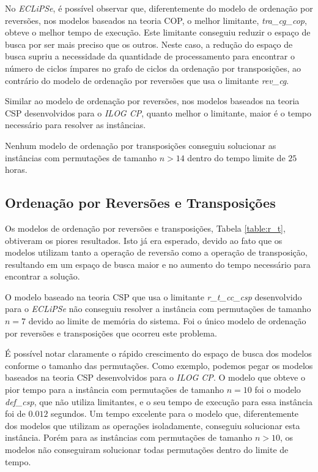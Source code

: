 No \textit{ECLiPSe}, é possível observar que, diferentemente do modelo
de ordenação por reversões, nos modelos baseados na teoria COP, o
melhor limitante, \textit{tra\_cg\_cop}, obteve o melhor tempo de
execução. Este limitante conseguiu reduzir o espaço de busca por ser
mais preciso que os outros. Neste caso, a redução do espaço de busca
supriu a necessidade da quantidade de processamento para encontrar o
número de ciclos ímpares no grafo de ciclos da ordenação por
transposições, ao contrário do modelo de ordenação por reversões que
usa o limitante \textit{rev\_cg}.

Similar ao modelo de ordenação por reversões, nos modelos baseados na
teoria CSP desenvolvidos para o \textit{ILOG CP}, quanto melhor o
limitante, maior é o tempo necessário para resolver as instâncias.

Nenhum modelo de ordenação por transposições conseguiu solucionar as
instâncias com permutações de tamanho $n > 14$ dentro do tempo limite
de $25$ horas.



\subsection{Ordenação por Reversões e Transposições}
\label{subsec:analise_r_t}
Os modelos de ordenação por reversões e transposições,
Tabela \ref{table:r_t}, obtiveram os piores resultados. Isto já era
esperado, devido ao fato que os modelos utilizam tanto a operação de
reversão como a operação de transposição, resultando em um espaço de
busca maior e no aumento do tempo necessário para encontrar a solução.

O modelo baseado na teoria CSP que usa o
limitante \textit{r\_t\_cc\_csp} desenvolvido para o \textit{ECLiPSe}
não conseguiu resolver a instância com permutações de tamanho $n = 7$
devido ao limite de memória do sistema. Foi o único modelo de
ordenação por reversões e transposições que ocorreu este problema.

É possível notar claramente o rápido crescimento do espaço de busca
dos modelos conforme o tamanho das permutações. Como exemplo, podemos
pegar os modelos baseados na teoria CSP desenvolvidos para
o \textit{ILOG CP}. O modelo que obteve o pior tempo para a instância
com permutações de tamanho $n = 10$ foi o modelo \textit{def\_csp},
que não utiliza limitantes, e o seu tempo de execução para essa
instância foi de $0.012$ segundos. Um tempo excelente para o modelo
que, diferentemente dos modelos que utilizam as operações
isoladamente, conseguiu solucionar esta instância. Porém para as
instâncias com permutações de tamanho $n > 10$, os modelos não
conseguiram solucionar todas permutações dentro do limite de tempo.

